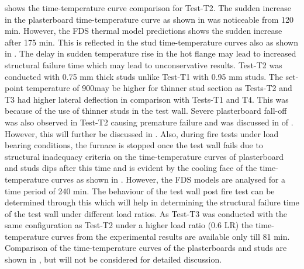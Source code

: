  shows the time-temperature curve comparison for Test-T2. The sudden increase in the plasterboard time-temperature curve as shown in  was noticeable from 120 min. However, the FDS thermal model predictions shows the sudden increase after 175 min. This is reflected in the stud time-temperature curves also as shown in . The delay in sudden temperature rise in the hot flange may lead to increased structural failure time which may lead to unconservative results. Test-T2 was conducted with 0.75 mm thick studs unlike Test-T1 with 0.95 mm studs. The set-point temperature of 900\degree may be higher for thinner stud section as Tests-T2 and T3 had higher lateral deflection in comparison with Tests-T1 and T4. This was because of the use of thinner studs in the test wall. Severe plasterboard fall-off was also observed in Test-T2 causing premature failure and was discussed in  of . However, this will further be discussed in . Also, during fire tests under load bearing conditions, the furnace is stopped once the test wall fails due to structural inadequacy criteria on the time-temperature curves of plasterboard and studs dips after this time and is evident by the cooling face of the time-temperature curves as shown in . However, the FDS models are analysed for a time period of 240 min. The behaviour of the test wall post fire test can be determined through this which will help in determining the structural failure time of the test wall under different load ratios. As Test-T3 was conducted with the same configuration as Test-T2 under a higher load ratio (0.6 LR) the time-temperature curves from the experimental results are available only till 81 min. Comparison of the time-temperature curves of the plasterboards and studs are shown in , but will not be considered for detailed discussion.  

